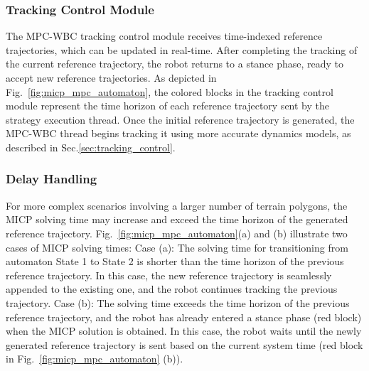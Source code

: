 \subsubsection{Tracking Control Module}
The MPC-WBC tracking control module receives time-indexed reference trajectories, which can be updated in real-time. After completing the tracking of the current reference trajectory, the robot returns to a stance phase, ready to accept new reference trajectories. As depicted in Fig.~\ref{fig:micp_mpc_automaton}, the colored blocks in the tracking control module represent the time horizon of each reference trajectory sent by the strategy execution thread. Once the initial reference trajectory is generated, the MPC-WBC thread begins tracking it using more accurate dynamics models, as described in Sec.\ref{sec:tracking_control}.

\subsubsection{Delay Handling}
For more complex scenarios involving a larger number of terrain polygons, the MICP solving time may increase and exceed the time horizon of the generated reference trajectory. Fig.~\ref{fig:micp_mpc_automaton}(a) and (b) illustrate two cases of MICP solving times:
Case (a): The solving time for transitioning from automaton State 1 to State 2 is shorter than the time horizon of the previous reference trajectory. In this case, the new reference trajectory is seamlessly appended to the existing one, and the robot continues tracking the previous trajectory.
Case (b): The solving time exceeds the time horizon of the previous reference trajectory, and the robot has already entered a stance phase (red block) when the MICP solution is obtained. In this case, the robot waits until the newly generated reference trajectory is sent based on the current system time (red block in Fig.~\ref{fig:micp_mpc_automaton} (b)).


